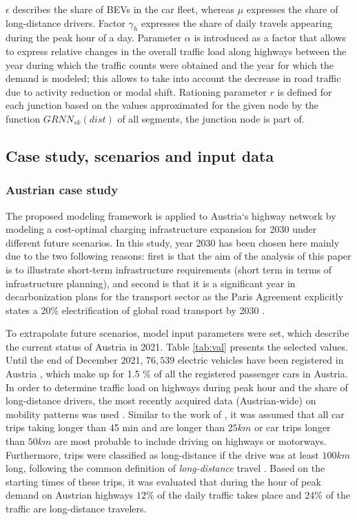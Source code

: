 \documentclass[journal,article,submit,pdftex,moreauthors]{Definitions/mdpi}
\begin{document}
    $\epsilon$ describes the share of BEVs in the car fleet, whereas $\mu$ expresses the share of long-distance drivers. Factor $\gamma_h$ expresses the share of daily travels appearing during the peak hour of a day. Parameter $\alpha$ is introduced as a factor that allows to express relative changes in the overall traffic load along highways between the year during which the traffic counts were obtained and the year for which the demand is modeled; this allows to take into account the decrease in road traffic due to activity reduction or modal shift. Rationing parameter $r$  is defined for each junction based on the values approximated for the given node by the function $GRNN_{sk} (dist)$ of all segments, the junction node is part of. 
    
    

    \subsection{Case study, scenarios and input data}
    
    \subsubsection{Austrian case study}
    The proposed modeling framework is applied to Austria`s highway network by modeling a cost-optimal charging infrastructure expansion for 2030 under different future scenarios. In this study, year 2030 has been chosen here mainly due to the two following reasons: first is that the aim of the analysis of this paper is to illustrate short-term infrastructure requirements (short term in terms of infrastructure planning), and second is that it is a significant year in decarbonization plans for the transport sector as the Paris Agreement explicitly states a 20\% electrification of global road transport by 2030 \citep{paris}.   
    
    To extrapolate future scenarios, model input parameters were set, which describe the current status of Austria in 2021. Table \ref{tab:val} presents the selected values. Until the end of December 2021, $76,539$ electric vehicles have been registered in Austria \citep{beoe}, which make up for 1.5 \% of all the registered passenger cars in Austria. In order to determine traffic load on highways during peak hour and the share of long-distance drivers, the most recently acquired data (Austrian-wide) on mobility patterns was used \citep{mob_survey}. Similar to the work of \citet{Jochem2016}, it was assumed that all car trips taking longer than 45 min and are longer than $25km$ or car trips longer than $50km$ are most probable to include driving on highways or motorways. Furthermore, trips were classified as long-distance if the drive was at least $100km$ long, following the common definition of \textit{long-distance} travel \citep{frei2010long}. Based on the starting times of these trips, it was evaluated that during the hour of peak demand on Austrian highways $12\%$ of the daily traffic takes place and 24\% of the traffic are long-distance travelers. 
    
\end{document}
